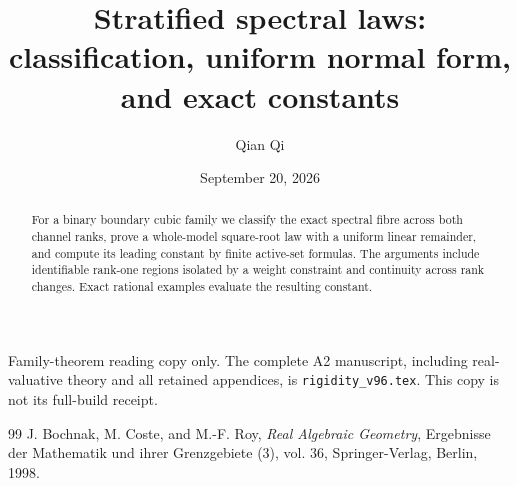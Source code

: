 
\title[Stratified spectral laws]{Stratified spectral laws:\\ classification, uniform normal form, and exact constants}
\author{Qian Qi}
\date{September 20, 2026}

\begin{abstract}
For a binary boundary cubic family we classify the exact spectral fibre
across both channel ranks, prove a whole-model square-root law with a
uniform linear remainder, and compute its leading constant by finite
active-set formulas. The arguments include identifiable rank-one
regions isolated by a weight constraint and continuity across rank
changes. Exact rational examples evaluate the resulting constant.
\end{abstract}
\maketitle
\begin{center}\small
Family-theorem reading copy only. The complete A2 manuscript, including
real-valuative theory and all retained appendices, is
\texttt{rigidity\_v96.tex}. This copy is not its full-build receipt.
\end{center}



\begin{thebibliography}{99}
 J. Bochnak, M. Coste, and M.-F. Roy,
\emph{Real Algebraic Geometry}, Ergebnisse der Mathematik und ihrer
Grenzgebiete (3), vol. 36, Springer-Verlag, Berlin, 1998.
\end{thebibliography}

